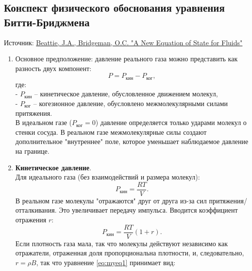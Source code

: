 \documentclass[a4paper]{article}
\numberwithin{equation}{subsection} %
\begin{document}
\subsection{Конспект физического обоснования уравнения Битти-Бриджмена}

Источник: \href{https://www.jstor.org/stable/20026205?searchText=Beattie\%2C+J.A.\%2C+Bridgeman\%2C+O.C.+\%22A+New+Equation+of+State+for+Fluids\%22&searchUri=\%2Faction\%2FdoBasicSearch\%3FQuery\%3DBeattie\%252C\%2BJ.A.\%252C\%2BBridgeman\%252C\%2BO.C.\%2B\%2522A\%2BNew\%2BEquation\%2Bof\%2BState\%2Bfor\%2BFluids\%2522\%26so\%3Drel&ab_segments=0\%2Fbasic_phrase_search\%2Fcontrol&refreqid=fastly-default\%3A3700c3db53f265ea23b574296ef458ee&seq=1}{Beattie, J.A., Bridgeman, O.C. "A New Equation of State for Fluids"}
\begin{enumerate}
\item Основное предположение: давление реального газа можно представить как разность двух компонент:
\begin{equation}
      P = P_{\text{кин}} - P_{\text{ког}}, \label{eq:myeq0}
\end{equation}
где:\\
- $P_{\text{кин}}$ -- кинетическое давление, обусловленное движением молекул,\\
- $P_{\text{ког}}$ -- когезионное давление, обусловлено межмолекулярными силами притяжения.\\
В идеальном газе ($P_{\text{ког}} = 0$) давление определяется только ударами молекул о стенки сосуда. В реальном газе межмолекулярные силы создают дополнительное "внутреннее" поле, которое уменьшает наблюдаемое давление на границе.
\item \textbf{Кинетическое давление}.\\ 
Для идеального газа (без взаимодействий и размера молекул):
\begin{equation}
      P_{\text{кин}} = \frac{RT}{V}.
\end{equation}
В реальном газе молекулы "отражаются" друг от друга из-за сил притяжения/отталкивания. Это увеличивает передачу импульса. Вводится коэффициент отражения $r$:
\begin{equation}
      P_{\text{кин}} = \frac{RT}{V}(1 + r). \label{eq:myeq1}
\end{equation}
Если плотность газа мала, так что молекулы действуют независимо как отражатели, отраженная доля пропорциональна плотности, и, следовательно, $r = \rho B$, так что уравнение \ref{eq:myeq1} принимает вид:
\begin{equation}

\end{equation}
\end{enumerate}
\end{document}
